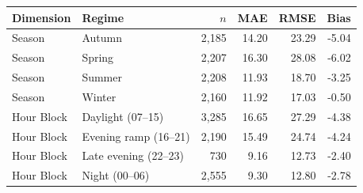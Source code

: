\begin{tabular}{llrrrr}
\toprule
Dimension & Regime & $n$ & MAE & RMSE & Bias \\
\midrule
Season & Autumn & 2,185 & 14.20 & 23.29 & -5.04 \\
Season & Spring & 2,207 & 16.30 & 28.08 & -6.02 \\
Season & Summer & 2,208 & 11.93 & 18.70 & -3.25 \\
Season & Winter & 2,160 & 11.92 & 17.03 & -0.50 \\
Hour Block & Daylight (07--15) & 3,285 & 16.65 & 27.29 & -4.38 \\
Hour Block & Evening ramp (16--21) & 2,190 & 15.49 & 24.74 & -4.24 \\
Hour Block & Late evening (22--23) & 730 & 9.16 & 12.73 & -2.40 \\
Hour Block & Night (00--06) & 2,555 & 9.30 & 12.80 & -2.78 \\
\bottomrule
\end{tabular}
